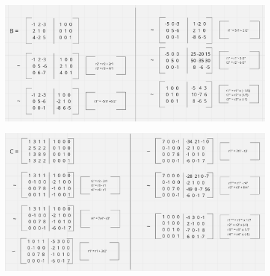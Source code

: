 \documentclass{article}
\begin{document}
    \begin{figure}[htbp]
        \centering
        \includegraphics[width=1.2\textwidth, height=.7\textheight]{../asset/invHWB.png}
        \label{fig:example}
    \end{figure}
    \begin{figure}[htbp]
        \centering
        \includegraphics[width=1.2\textwidth, height=.7\textheight]{../asset/invHWC.png}
        \label{fig:example}
    \end{figure}

    \newpage

    
\end{document}
